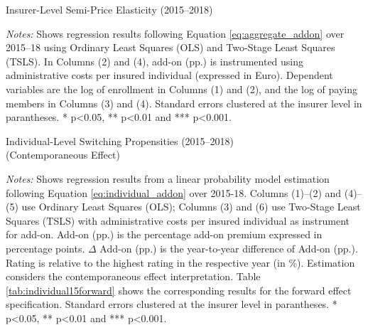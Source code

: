 \documentclass[a4paper, 11pt, english]{article}
\begin{document}
\begin{table}
	\caption{Insurer-Level Semi-Price Elasticity (2015--2018)}
	\label{tab:IVaggregatesecondstage_addon}
	
	\begin{minipage}{\textwidth}
		\vspace{3pt} 
		\footnotesize \textit{Notes:} Shows regression results following Equation \eqref{eq:aggregate_addon} over 2015--18 using Ordinary Least Squares (OLS) and Two-Stage Least Squares (TSLS). 
		In Columns (2) and (4), add-on (pp.) is instrumented using administrative costs per insured individual (expressed in Euro). 
		Dependent variables are the log of enrollment in Columns (1) and (2), and the log of paying members in Columns (3) and (4).
		Standard errors clustered at the insurer level in parantheses. * p<0.05, **  p<0.01 and *** p<0.001. 
	\end{minipage}	
\end{table}


\begin{table}[ht]
	\captionsetup{justification=centering}
	\caption{Individual-Level Switching Propensities (2015--2018) \\ (Contemporaneous Effect)}
	\label{tab:individual15cont}
	\begin{adjustbox}{width=\textwidth}
		
	\end{adjustbox}
	\begin{minipage}{\textwidth}
		\vspace{3pt}
		\footnotesize \textit{Notes:} Shows regression results from a linear probability model estimation following Equation \eqref{eq:individual_addon} over 2015-18. Columns (1)--(2) and (4)--(5) use Ordinary Least Squares (OLS); Columns (3) and (6) use Two-Stage Least Squares (TSLS) with administrative costs per insured individual as instrument for add-on. 
		Add-on (pp.) is the percentage add-on premium expressed in percentage points. $\Delta$ Add-on (pp.) is the year-to-year difference of Add-on (pp.). Rating is relative to the highest rating in the respective year (in \%).
		Estimation considers the contemporaneous effect interpretation. Table \ref{tab:individual15forward} shows the corresponding results for the forward effect specification.
		Standard errors clustered at the insurer level in parantheses. * p<0.05, **  p<0.01 and *** p<0.001. 
	\end{minipage}
\end{table}
\end{document}
